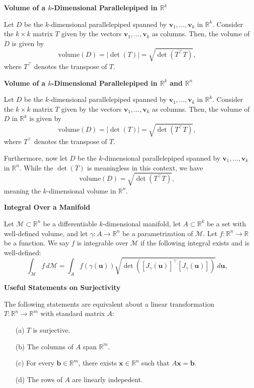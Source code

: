 \documentclass{article}
\newcommand{\R}{\mathbb{R}}
\newenvironment{definition}[1]{
    \par\noindent\textbf{#1}\par\noindent
}{
    \par \vspace{0.5cm}
}
\begin{document}
\begin{definition}{Volume of a \(k\)-Dimensional Parallelepiped in \(\R^k\)}
Let \(D\) be the \(k\)-dimensional parallelepiped spanned by \(\bm{v}_1, \ldots, \bm{v}_k\) in \(\R^k\). Consider the \(k \times k\) matrix \(T\) given by the vectors \(\bm{v}_1, \ldots, \bm{v}_k\) as columns. Then, the volume of \(D\) is given by
\[
\text{volume}(D) = |\det(T)| = \sqrt{\det(T^\top T)},
\]
where \(T^\top\) denotes the transpose of \(T\).
\end{definition}


\begin{definition}{Volume of a \(k\)-Dimensional Parallelepiped in \(\R^k\) and \(\R^n\)}
Let \(D\) be the \(k\)-dimensional parallelepiped spanned by \(\bm{v}_1, \ldots, \bm{v}_k\) in \(\R^k\). Consider the \(k \times k\) matrix \(T\) given by the vectors \(\bm{v}_1, \ldots, \bm{v}_k\) as columns. Then, the volume of \(D\) in \(\R^k\) is given by
\[
\text{volume}(D) = |\det(T)| = \sqrt{\det(T^\top T)},
\]
where \(T^\top\) denotes the transpose of \(T\).

\vspace{0.7cm}
Furthermore, now let \(D\) be the \(k\)-dimensional parallelepiped spanned by \(\bm{v}_1, \ldots, \bm{v}_k\) in \(\R^n\). While the \(\det(T)\) is meaningless in this context, we have 
\[
\text{volume}(D) = \sqrt{\det(T^\top T)},
\]
meaning the \(k\)-dimensional volume in \(\R^n\).
\end{definition}

\begin{definition}{Integral Over a Manifold}
Let \(\mathcal{M} \subset \R^n\) be a differentiable \(k\)-dimensional manifold, let \(A \subset \R^k\) be a set with well-defined volume, and let \(\gamma : A \to \R^n\) be a parametrization of \(\mathcal{M}\). Let \(f : \R^n \to \R\) be a function. We say \(f\) is integrable over \(\mathcal{M}\) if the following integral exists and is well-defined:
\[
\int_{\mathcal{M}} f \, d\mathcal{M} = \int_{A} f(\gamma(\bm{u})) \sqrt{ \det\left([J_\gamma(\bm{u})]^\top [J_\gamma(\bm{u})]\right)} \, d\bm{u},
\]
\end{definition}

\begin{definition}{Useful Statements on Surjectivity}
The following statements are equivalent about a linear transformation \(T : \R^n \to \R^m\) with standard matrix \(A\):
\begin{enumerate}
    \item[(a)] \(T\) is surjective.
    \item[(b)] The columns of \(A\) span \(\R^m\).
    \item[(c)] For every \(\bm{b} \in \R^m\), there exists \(\bm{x} \in \R^n\) such that \(A\bm{x} = \bm{b}\).
    \item[(d)] The rows of \(A\) are linearly indepedent.
\end{enumerate}
\end{definition}
\end{document}
